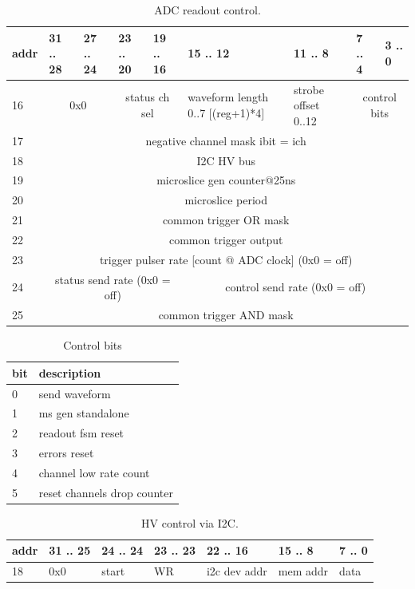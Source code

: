 \documentclass{article}
\begin{document}
\begin{table}[H]
\centering
\begin{tabular}{| l | l | l | l | l | l | l | l | l |}
\hline
addr & 31 .. 28 & 27 .. 24 & 23 .. 20 & 19 .. 16 & 15 .. 12 & 11 .. 8 & 7 .. 4 & 3 .. 0 \\ \hline
16 & \multicolumn{2}{c|}{0x0} & \multicolumn{2}{c|}{status ch sel} & waveform length 0..7 [(reg+1)*4] & strobe offset 0..12 & \multicolumn{2}{c|}{control bits} \\ \hline
17 & \multicolumn{8}{c|}{negative channel mask ibit = ich} \\ \hline
18 & \multicolumn{8}{c|}{I2C HV bus} \\ \hline
19 & \multicolumn{8}{c|}{microslice gen counter@25ns} \\ \hline
20 & \multicolumn{8}{c|}{microslice period} \\ \hline
21 & \multicolumn{8}{c|}{common trigger OR mask} \\ \hline
22 & \multicolumn{8}{c|}{common trigger output} \\ \hline
23 & \multicolumn{8}{c|}{trigger pulser rate [count @ ADC clock] (0x0 = off)} \\ \hline
24 & \multicolumn{4}{c|}{status send rate (0x0 = off)}& \multicolumn{4}{c|}{control send rate (0x0 = off)} \\ \hline
25 & \multicolumn{8}{c|}{common trigger AND mask} \\
\hline
\end{tabular}
\caption{ADC readout control.}
\end{table}

\begin{table}[H]
\centering
\begin{tabular}{| l | l |}
\hline
bit & description \\ \hline
0 & send waveform \\ \hline
1 & ms gen standalone \\ \hline
2 & readout fsm reset \\ \hline
3 & errors reset \\ \hline
4 & channel low rate count \\ \hline
5 & reset channels drop counter \\ \hline
\end{tabular}
\caption{Control bits\label{tab6}}
\end{table}

\begin{table}[H]
\centering
\begin{tabular}{| l | l | l | l | l | l | l |}
\hline
addr & 31 .. 25 & 24 .. 24 & 23 .. 23 & 22 .. 16 & 15 .. 8 & 7 .. 0 \\ \hline
18 & 0x0 & start & WR & i2c dev addr & mem addr & data \\ \hline
\end{tabular}
\caption{HV control via I2C.\label{tab7}}
\end{table}
\end{document}

